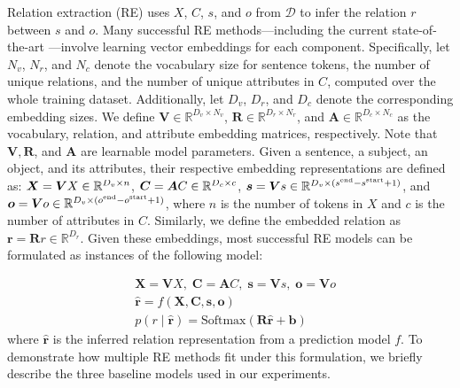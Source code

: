 Relation extraction (RE) uses $X$, $C$, $s$, and $o$ from $\mathcal{D}$ to infer the relation $r$ between $s$ and $o$.
Many successful RE methods---including the current state-of-the-art \citep{bert-em}---involve learning vector embeddings for each component.
Specifically, let $N_v$, $N_r $, and $N_c$ denote the vocabulary size for sentence tokens, the number of unique relations, and the number of unique attributes in $C$, computed over the whole training dataset.
Additionally, let $D_v$, $D_r $, and $D_c$ denote the corresponding embedding sizes.
We define $\bm{V}\in\mathbb{R}^{D_v\times N_v}$, $\bm{R}\in\mathbb{R}^{D_r\times N_r}$, and $\bm{A}\in\mathbb{R}^{D_c\times N_c}$ as the vocabulary, relation, and attribute embedding matrices, respectively.
Note that $\bm{V}, \bm{R}$, and $\bm{A}$ are learnable model parameters.
Given a sentence, a subject, an object, and its attributes, their respective embedding representations are defined as:
$\bm{X} = \bm{V}X \in \smash{\mathbb{R}^{D_v \times n}}$,
$\bm{C} = \bm{A}C \in \smash{\mathbb{R}^{D_c\times c}}$,
$\bm{s} = \bm{V}s \in \smash{\mathbb{R}^{D_v \times (s^{\textrm{end}} - s^{\textrm{start}} + 1)}}$, and
$\bm{o} = \bm{V}o \in \smash{\mathbb{R}^{D_v \times (o^{\textrm{end}} - o^{\textrm{start}} + 1)}}$,
where $n$ is the number of tokens in $X$ and $c$ is the number of attributes in $C$.
Similarly, we define the embedded relation as $\bm{r} = \bm{R}r \in \mathbb{R}^{D_r}$.
Given these embeddings, most successful RE models \citep[e.g.,][]{palstm,cgcn,aggcn,tre,bert-em} can be formulated as instances of the following model:

\begin{align}
    & \bm{X} = \bm{V}X,\;
      \bm{C} = \bm{A}C,\;
      \bm{s} = \bm{V}s,\;
      \bm{o} = \bm{V}o \\
    & \hat{\bm{r}} = f(\bm{X}, \bm{C}, \bm{s}, \bm{o}) \\
    & p(r \mid \hat{\bm{r}}) = \textrm{Softmax}(\bm{R}\hat{\bm{r}} + \bm{b})
    \label{eq:re-model}
\end{align}
where $\hat{\bm{r}}$ is the inferred relation representation from a prediction model $f$.
To demonstrate how multiple RE methods fit under this formulation, we briefly describe the three baseline models used in our experiments.

